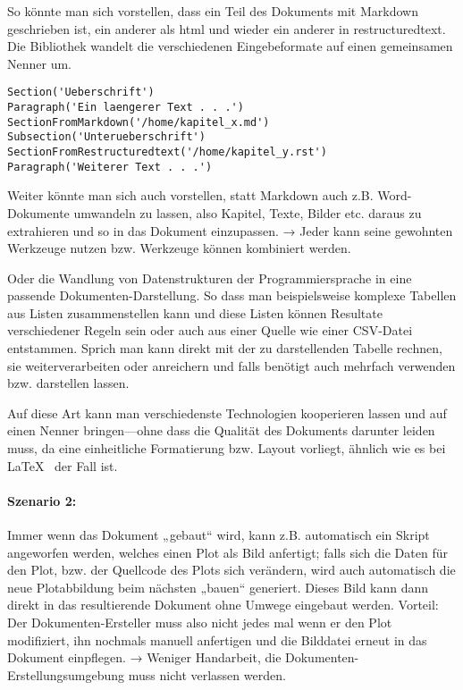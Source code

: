 So könnte man sich vorstellen, dass ein Teil des Dokuments mit Markdown
geschrieben ist, ein anderer als html und wieder ein anderer in
restructuredtext. Die Bibliothek wandelt die verschiedenen Eingebeformate
auf einen gemeinsamen Nenner um.

\begin{verbatim}
Section('Ueberschrift')
Paragraph('Ein laengerer Text . . .')
SectionFromMarkdown('/home/kapitel_x.md')
Subsection('Unterueberschrift')
SectionFromRestructuredtext('/home/kapitel_y.rst')
Paragraph('Weiterer Text . . .')
\end{verbatim}

Weiter könnte man sich auch vorstellen, statt Markdown auch z.B. Word-Dokumente
umwandeln zu lassen, also Kapitel, Texte, Bilder etc. daraus zu extrahieren und
so in das Dokument einzupassen.
→ Jeder kann seine gewohnten Werkzeuge nutzen bzw.
Werkzeuge können kombiniert werden.

Oder die Wandlung von Datenstrukturen der Programmiersprache in eine passende
Dokumenten-Darstellung. So dass man beispielsweise komplexe Tabellen aus
Listen zusammenstellen kann und diese Listen können Resultate
verschiedener Regeln sein oder auch aus einer Quelle wie einer CSV-Datei
entstammen. Sprich man kann direkt mit der zu darstellenden Tabelle
rechnen, sie weiterverarbeiten oder anreichern und falls benötigt auch
mehrfach verwenden bzw. darstellen lassen.

Auf diese Art kann man verschiedenste Technologien kooperieren lassen und
auf einen Nenner bringen---ohne dass die Qualität des Dokuments darunter
leiden muss, da eine einheitliche Formatierung bzw. Layout vorliegt,
ähnlich wie es bei \LaTeX~ der Fall ist.

\paragraph{Szenario 2:} Immer wenn das Dokument „gebaut“ wird, kann z.B.
automatisch ein Skript angeworfen werden, welches einen Plot als Bild
anfertigt; falls sich die Daten für den Plot, bzw. der Quellcode
des Plots sich verändern, wird auch automatisch die neue Plotabbildung
beim nächsten „bauen“ generiert.
Dieses Bild kann dann direkt in das resultierende Dokument ohne
Umwege eingebaut werden. Vorteil: Der Dokumenten-Ersteller muss also nicht jedes
mal wenn er den Plot modifiziert, ihn nochmals manuell anfertigen und
die Bilddatei erneut in das Dokument einpflegen. → Weniger Handarbeit,
die Dokumenten-Erstellungsumgebung muss nicht verlassen werden.

